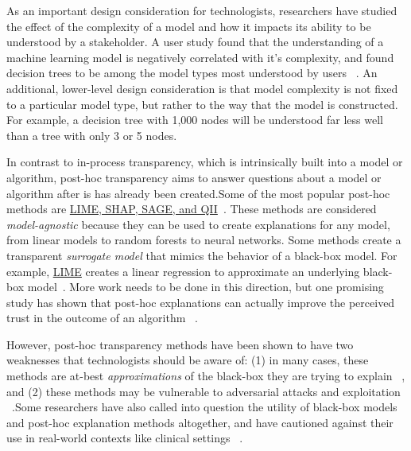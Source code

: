 As an important design consideration for technologists, researchers have studied the effect of the complexity of a model and how it impacts its ability to be understood by a stakeholder. A user study found that the understanding of a machine learning model is negatively correlated with it's complexity, and found decision trees to be among the model types most understood by users ~\cite{DBLP:conf/scai/AllahyariL11}. An additional, lower-level design consideration is that model complexity is not fixed to a particular model type, but rather to the way that the model is constructed. For example, a decision tree with 1,000 nodes will be understood far less well than a tree with only 3 or 5 nodes.

In contrast to in-process transparency, which is intrinsically built into a model or algorithm, post-hoc transparency aims to answer questions about a model or algorithm after is has already been created.Some of the most popular post-hoc methods are \underline{LIME, SHAP, SAGE, and QII}~\cite{DBLP:conf/nips/LundbergL17, ribeiro2016should, datta2016algorithmic, DBLP:journals/corr/abs-2004-00668}. These methods are considered \emph{model-agnostic} because they can be used to create explanations for any model, from linear models to random forests to neural networks. Some methods create a transparent \emph{surrogate model} that mimics the behavior of a black-box model. For example, \underline{LIME} creates a linear regression to approximate an underlying black-box model~\cite{DBLP:conf/nips/LundbergL17}. More work needs to be done in this direction, but one promising study has shown that post-hoc explanations can actually improve the perceived trust in the outcome of an algorithm ~\cite{DBLP:conf/softcomp/BekriKH19}.

However, post-hoc transparency methods have been shown to have two weaknesses that technologists should be aware of: (1) in many cases, these methods are at-best \emph{approximations} of the black-box they are trying to explain ~\cite{zhang2019should}, and (2) these methods may be vulnerable to adversarial attacks and exploitation ~\cite{DBLP:conf/aies/SlackHJSL20}.Some researchers have also called into question the utility of black-box models and post-hoc explanation methods altogether, and have cautioned against their use in real-world contexts like clinical settings ~\cite{rudin2019stop}.%

